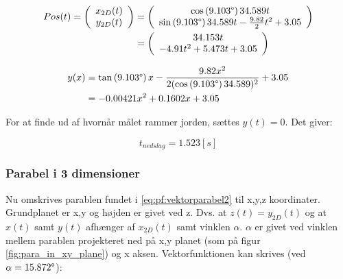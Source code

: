\begin{align}
\begin{split}
	Pos(t) = \left( \begin{array}{c}
	x_{2D}(t) \\
	y_{2D}(t)
	\end{array}
	\right)
	&= \left( \begin{array}{c}
	\cos \left(9.103 \degree \right) 34.589 t \\
	\sin \left(9.103 \degree \right) 34.589 t - \frac{9.82}{2} t^2 + 3.05
	\end{array}
	\right) \\
	&= \left( \begin{array}{c}
	34.153 t \\
	- 4.91 t^2 + 5.473 t + 3.05
	\end{array}
	\right)
\label{eq:pf:vektorparabel2}
\end{split}
\end{align}

\begin{align}
\begin{split}
y(x) &= \tan \left(9.103 \degree \right) x - \frac{9.82x^2}{2(\cos \left(9.103 \degree \right) 34.589)^2} + 3.05 \\
&= - 0.00421 x^2 + 0.1602 x  + 3.05
\label{eq:pf:y(x)3}
\end{split}
\end{align}

For at finde ud af hvornår målet rammer jorden, sættes $y(t) = 0$. Det giver:

\begin{equation}
t_{nedslag} = 1.523 [s]
\label{eq:pf:nedslagstid}
\end{equation}

\subsubsection{Parabel i 3 dimensioner}
Nu omskrives parablen fundet i \ref{eq:pf:vektorparabel2} til x,y,z koordinater. 
Grundplanet er x,y og højden er givet ved z. Dvs. at $z(t) = y_{2D}(t)$ og at $x(t)$ samt $y(t)$ afhænger af $x_{2D}(t)$ samt vinklen $\alpha$. 
$\alpha$ er givet ved vinklen mellem parablen projekteret ned på x,y planet (som på figur \ref{fig:para_in_xy_plane}) og x aksen. 
Vektorfunktionen kan skrives (ved $\alpha = 15.872 \degree$): 

